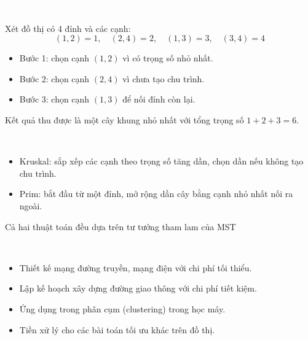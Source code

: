 \documentclass{beamer}
\newcommand{\hlblue}[1]{\textcolor{myblue}{#1}}
\newcommand{\hlgreen}[1]{\textcolor{mygreen}{#1}}
\newcommand{\hlred}[1]{\textcolor{myred}{#1}}
\newcommand{\hlpurple}[1]{\textcolor{mypurple}{#1}}
\newcommand{\hlorange}[1]{\textcolor{myorange}{#1}}
\newcommand{\hlcyan}[1]{\textcolor{mycyan}{#1}}
\newcommand{\hlwhite}[1]{\textcolor{white}{#1}}
\begin{document}

\begin{frame}{\hlwhite{Ví dụ từng bước chọn cạnh}}
\begin{tcolorbox}[title=\textbf{\hlgreen{Đồ thị ví dụ}}]
Xét đồ thị có 4 đỉnh và các cạnh:
\[
(1,2)=1,\quad (2,4)=2,\quad (1,3)=3,\quad (3,4)=4
\]
\end{tcolorbox}

\begin{itemize}
  \item Bước 1: chọn cạnh \hlred{$(1,2)$} vì có trọng số nhỏ nhất.
  \item Bước 2: chọn cạnh \hlred{$(2,4)$} vì chưa tạo chu trình.
  \item Bước 3: chọn cạnh \hlred{$(1,3)$} để nối đỉnh còn lại.
\end{itemize}

\begin{tcolorbox}
\centering
\hlblue{Kết quả thu được là một cây khung nhỏ nhất với tổng trọng số \(1+2+3=6\).}
\end{tcolorbox}
\end{frame}


\begin{frame}{\hlwhite{Greedy \(\rightarrow\) Thuật toán MST}}
\begin{itemize}
  \item \hlblue{Kruskal}: sắp xếp các cạnh theo trọng số tăng dần, chọn dần nếu \hlred{không tạo chu trình}.
  \item \hlgreen{Prim}: bắt đầu từ một đỉnh, mở rộng dần cây bằng cạnh \hlred{nhỏ nhất nối ra ngoài}.
\end{itemize}

\begin{tcolorbox}
\centering
\hlorange{Cả hai thuật toán đều dựa trên tư tưởng tham lam của MST}
\end{tcolorbox}
\end{frame}


\begin{frame}{\hlwhite{Ứng dụng của MST}}
\begin{itemize}
  \item Thiết kế \hlblue{mạng đường truyền}, \hlgreen{mạng điện} với chi phí tối thiểu.
  \item Lập kế hoạch xây dựng \hlorange{đường giao thông} với chi phí tiết kiệm.
  \item Ứng dụng trong \hlpurple{phân cụm (clustering)} trong học máy.
  \item \hlcyan{Tiền xử lý} cho các bài toán tối ưu khác trên đồ thị.
\end{itemize}
\end{frame}
\end{document}
